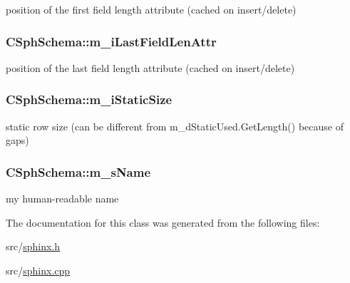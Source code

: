position of the first field length attribute (cached on insert/delete) 

\hypertarget{classCSphSchema_aae2d47f85e1897dc10517f9af57ad7b7}{
\subsubsection[{m\-\_\-i\-Last\-Field\-Len\-Attr}]{ C\-Sph\-Schema\-::m\-\_\-i\-Last\-Field\-Len\-Attr\hspace{0.3cm}{\ttfamily [protected]}}}\label{classCSphSchema_aae2d47f85e1897dc10517f9af57ad7b7}


position of the last field length attribute (cached on insert/delete) 

\hypertarget{classCSphSchema_a76308bc7520f1114f074351fac29d106}{
\subsubsection[{m\-\_\-i\-Static\-Size}]{ C\-Sph\-Schema\-::m\-\_\-i\-Static\-Size}}\label{classCSphSchema_a76308bc7520f1114f074351fac29d106}


static row size (can be different from m\-\_\-d\-Static\-Used.\-Get\-Length() because of gaps) 

\hypertarget{classCSphSchema_ab00ee49c53efc1c7cca2a3bafdd32e5b}{
\subsubsection[{m\-\_\-s\-Name}]{ C\-Sph\-Schema\-::m\-\_\-s\-Name}}\label{classCSphSchema_ab00ee49c53efc1c7cca2a3bafdd32e5b}


my human-\/readable name 



The documentation for this class was generated from the following files\-:\begin{DoxyCompactItemize}
\item 
src/\hyperlink{sphinx_8h}{sphinx.\-h}\item 
src/\hyperlink{sphinx_8cpp}{sphinx.\-cpp}\end{DoxyCompactItemize}
